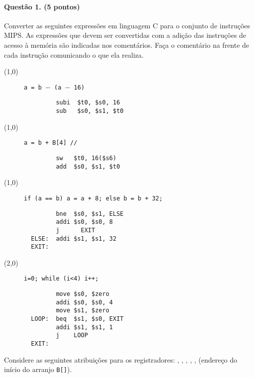 
\paragraph{Questão 1. (5 pontos)} Converter as seguintes expressões em linguagem C para
o conjunto de instruções MIPS. As expressões que devem ser convertidas com a adição 
das instruções de acesso à memória são indicadas nos comentários. 
Faça o comentário na frente de cada instrução
comunicando o que ela realiza.

\begin{description}
\item[(1,0)] {\tt a = b $-$ (a $-$ 16)}
\ifnum{}
\begin{verbatim}
         subi  $t0, $s0, 16
         sub   $s0, $s1, $t0
  \end{verbatim}
\fi  
\item[(1,0)] {\tt a = b + B[4] // \M}
\ifnum{}
\begin{verbatim}
         sw   $t0, 16($s6)
         add  $s0, $s1, $t0
  \end{verbatim}
\fi

\item[(1,0)] {\tt if (a == b) a = a + 8; else b = b + 32;}
\ifnum{}
\begin{verbatim}
         bne  $s0, $s1, ELSE
         addi $s0, $s0, 8
         j      EXIT
  ELSE:  addi $s1, $s1, 32
  EXIT:
  \end{verbatim}
\fi

\item[(2,0)] {\tt i=0; while (i<4) i++;}

\ifnum{}
\begin{verbatim}
         move $s0, $zero
         addi $s0, $s0, 4
         move $s1, $zero
  LOOP:  beq  $s1, $s0, EXIT
         addi $s1, $s1, 1
         j    LOOP
  EXIT: 
  \end{verbatim}
\fi

  

\end{description}

Considere as seguintes atribuições para os registradores: , , 
, , ,  (endereço do início do arranjo {\tt B[]}).

